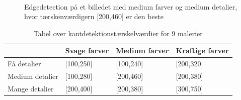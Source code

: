 \begin{figure}[!h]
    \centering
    \\
        \caption[]{Edgedetection på et billedet med medium farver og medium detalier, hvor tærskenværdigern [200,460] er den beste}
     \label{tre}
\end{figure}

\begin{table}[!h]
    \centering
    \begin{tabular}{| l | l | l | l |} \hline
        & Svage farver 	& Medium farver & Kraftige farver \\ \hline
        Få detalier 		& [100,250]		& [100,240]		& [200,320]\\ \hline
        Medium detalier 	& [100,280]		& [200,460]		& [200,380]\\ \hline
        Mange detalier		& [200,400]		& [200,380]		& [300,750]\\ \hline
    \end{tabular}
    \caption{Tabel over kantdetektionstærskelværdier for 9 malerier}
    \label{thressholdsTabelKant}
\end{table}

